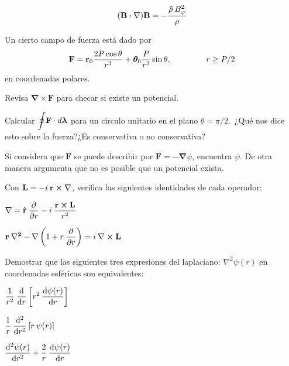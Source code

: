\documentclass[12pt]{article}
\begin{document}
\begin{milista}
\[ (\vb{B} \vdot \vb{\nabla}) \vb{B} = - \dfrac{\vu{\rho} \: B_{\varphi}^{2}}{\rho} \]
\item Un cierto campo de fuerza está dado por
\[ \mathbf{F} = \mathbf{r}_{0} \dfrac{2 P \cos \theta}{r^{3}} + \bm{\theta}_{0} \dfrac{P}{r^{3}} \sin \theta, \hspace{1.5cm} r \geq P/2 \]
en coordenadas polares.
\begin{milista}
\item Revisa $\bm{\nabla} \times \mathbf{F}$ para checar si existe un potencial.
\item Calcular $\mathlarger{\oint} \mathbf{F} \cdot d \bm{\lambda}$ para un círculo unitario en el plano $\theta = \pi/2$.\
¿Qué nos dice esto sobre la fuerza?¿Es conservativa o no conservativa?
\item Si considera que $\mathbf{F}$ se puede describir por $\mathbf{F} = - \bm{\nabla}\psi$, encuentra $\psi$. De otra manera argumenta que no es posible que un potencial exista.
\end{milista}
\item Con $\vb{L} = -i \: \vb{r} \cp \vb{\nabla}$, verifica las siguientes identidades de cada operador:
\begin{milista}
\item $\vb{\nabla} = \vu{r} \: \displaystyle \pdv{r} - i \: \dfrac{\vb{r} \cp \vb{L}}{r^{2}}$
\item $\vb{r} \: \vb{\nabla^{2}} - \vb{\nabla} \left( 1 + r \: \displaystyle \pdv{r} \right) = i \: \vb{\nabla} \cp \vb{L}$
\end{milista}
\item Demostrar que las siguientes tres expresiones del laplaciano: $\nabla^{2} \psi(r)$ en coordenadas esféricas son equivalentes:
\begin{milista}\itemsep4pt
\item $\displaystyle \dfrac{1}{r^{2}} \: \dv{r} \left[ r^{2} \: \dv{\psi(r)}{r} \right]$
\item $\displaystyle \dfrac{1}{r} \: \dv[2]{r} \left[ r \: \psi(r) \right]$
\item $\displaystyle\dv[2]{\psi(r)}{r} + \dfrac{2}{r} \: \dv{\psi(r)}{r}$ 
\end{milista}

\end{milista}
\end{document}
